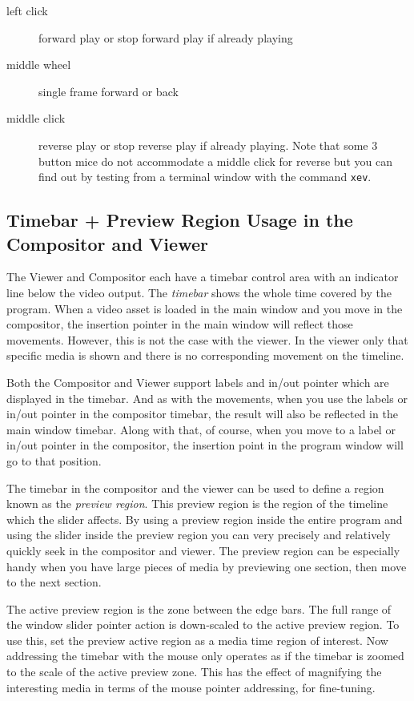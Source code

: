 \begin{description}
    \item[left click]  forward play or stop forward play if already playing
    \item[middle wheel]  single frame forward or back
    \item[middle click]  reverse play or stop reverse play if already playing. 
        Note that some 3 button mice do not accommodate a middle click for reverse but you can find out by testing from a terminal window with the command \texttt{xev}.
\end{description}

\subsection{Timebar + Preview Region Usage in the Compositor and Viewer}%
\label{sub:timebar_preview_region_usage_in_the_compositor_and_viewer}

The Viewer and Compositor each have a timebar control area with an indicator line below the video
output. The \textit{timebar} shows the whole time covered by the program. When a video asset
is loaded in the main window and you move in the compositor, the insertion pointer in the main
window will reflect those movements.  However, this is not the case with the viewer.  In the viewer
only that specific media is shown and there is no corresponding movement on the timeline.

Both the Compositor and Viewer support labels and in/out pointer which are displayed in the timebar.
And as with the movements, when you use the labels or in/out pointer in the compositor timebar,
the result will also be reflected in the main window timebar.  Along with that, of course, when
you move to a label or in/out pointer in the compositor, the insertion point in the program window
will go to that position.

The timebar in the compositor and the viewer can be used to define a region known as the \textit{preview region}.  
This preview region is the region of the timeline which the slider affects.  
By using a preview region inside the entire program and using the slider inside the preview region you can very precisely and relatively quickly seek in the compositor and viewer.  
The preview region can be especially handy when you have large pieces of media by previewing one section, then move to the next section.  

The active preview region is the zone between the edge bars.  
The full range of the window slider pointer action is down-scaled to the active preview region.   
To use this, set the preview active region as a media time region of interest.  
Now addressing the timebar with the mouse only operates as if the timebar is zoomed to the scale of the active preview zone.  
This has the effect of magnifying the interesting media in terms of the mouse pointer addressing, for fine-tuning.

